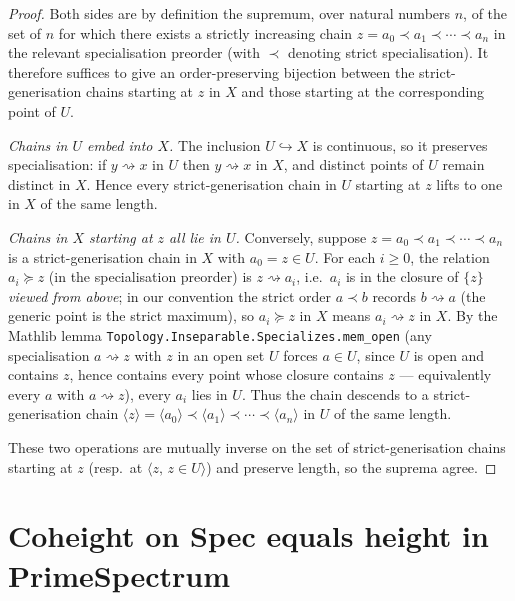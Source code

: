 \begin{proof}
  \leanok

Both sides are by definition the supremum, over natural numbers \(n\), of the
  set of \(n\) for which there exists a strictly increasing chain
  \(z = a_0 \prec a_1 \prec \cdots \prec a_n\) in the relevant
  specialisation preorder (with \(\prec\) denoting strict specialisation). It
  therefore suffices to give an order-preserving bijection between the
  strict-generisation chains starting at \(z\) in \(X\) and those starting at the
  corresponding point of \(U\).

  \emph{Chains in \(U\) embed into \(X\).} The inclusion \(U \hookrightarrow X\) is
  continuous, so it preserves specialisation: if \(y \rightsquigarrow x\) in \(U\)
  then \(y \rightsquigarrow x\) in \(X\), and distinct points of \(U\) remain
  distinct in \(X\). Hence every strict-generisation chain in \(U\) starting at
  \(z\) lifts to one in \(X\) of the same length.

  \emph{Chains in \(X\) starting at \(z\) all lie in \(U\).} Conversely, suppose
  \(z = a_0 \prec a_1 \prec \cdots \prec a_n\) is a strict-generisation chain
  in \(X\) with \(a_0 = z \in U\). For each \(i \geq 0\), the relation \(a_i \succeq
  z\) (in the specialisation preorder) is \(z \rightsquigarrow a_i\), i.e.\
  \(a_i\) is in the closure of \(\{z\}\) \emph{viewed from above}; in our
  convention the strict order \(a \prec b\) records \(b \rightsquigarrow a\)
  (the generic point is the strict maximum), so \(a_i \succeq z\) in \(X\) means
  \(a_i \rightsquigarrow z\) in \(X\). By the Mathlib lemma
  \texttt{Topology.Inseparable.Specializes.mem\_open} (any specialisation
  \(a \rightsquigarrow z\) with \(z\) in an open set \(U\) forces \(a \in U\), since
  \(U\) is open and contains \(z\), hence contains every point whose closure
  contains \(z\) --- equivalently every \(a\) with \(a \rightsquigarrow z\)),
  every \(a_i\) lies in \(U\). Thus the chain descends to a strict-generisation
  chain \(\langle z\rangle = \langle a_0\rangle \prec \langle a_1\rangle \prec
  \cdots \prec \langle a_n\rangle\) in \(U\) of the same length.

  These two operations are mutually inverse on the set of strict-generisation
  chains starting at \(z\) (resp.\ at \(\langle z, \, z \in U\rangle\)) and
  preserve length, so the suprema agree.
\end{proof}

\section{Coheight on Spec equals height in PrimeSpectrum}
\label{mk-sec:coheight_spec_duality}

